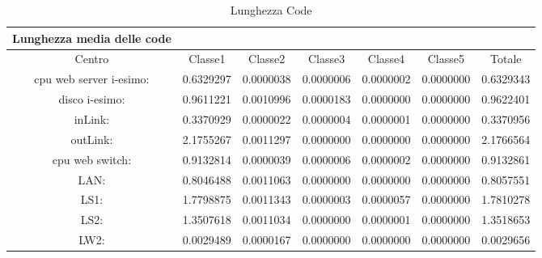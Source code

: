 \begin{table}[htbp]
\begin{center}
\begin{tabular}{||c|c|c|c|c|c|c||}
\hline
Lunghezza media delle code\\
\hline
Centro &Classe1 &Classe2 &Classe3 &Classe4 &Classe5 &Totale\\
\hline
\hline
 cpu web server i-esimo: 	&0.6329297	&0.0000038	&0.0000006	&0.0000002	&0.0000000	&0.6329343\\
\hline
 disco i-esimo: 	&0.9611221	&0.0010996	&0.0000183	&0.0000000	&0.0000000	&0.9622401\\
\hline
 inLink: 	&0.3370929	&0.0000022	&0.0000004	&0.0000001	&0.0000000	&0.3370956\\
\hline
 outLink: 	&2.1755267	&0.0011297	&0.0000000	&0.0000000	&0.0000000	&2.1766564\\
\hline
 cpu web switch: 	&0.9132814	&0.0000039	&0.0000006	&0.0000002	&0.0000000	&0.9132861\\
\hline
 LAN: 	&0.8046488	&0.0011063	&0.0000000	&0.0000000	&0.0000000	&0.8057551\\
\hline
 LS1: 	&1.7798875	&0.0011343	&0.0000003	&0.0000057	&0.0000000	&1.7810278\\
\hline
 LS2: 	&1.3507618	&0.0011034	&0.0000000	&0.0000001	&0.0000000	&1.3518653\\
\hline
 LW2: 	&0.0029489	&0.0000167	&0.0000000	&0.0000000	&0.0000000	&0.0029656\\
\hline
\end{tabular}
\end{center}
\caption{Lunghezza Code}
\label{lunghezzacode}
\end{table}

